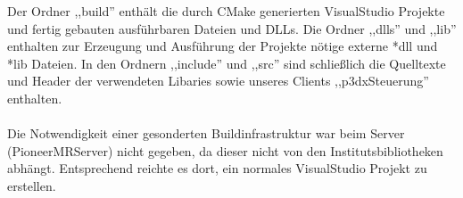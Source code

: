 Der Ordner ,,build'' enthält die durch CMake generierten VisualStudio
Projekte und fertig gebauten ausführbaren Dateien und DLLs. Die Ordner
,,dlls'' und ,,lib'' enthalten zur Erzeugung und Ausführung der
Projekte nötige externe *dll und *lib Dateien. In den Ordnern
,,include'' und ,,src'' sind schließlich die Quelltexte und Header der
verwendeten Libaries sowie unseres Clients ,,p3dxSteuerung''
enthalten. \\\\
Die Notwendigkeit einer gesonderten Buildinfrastruktur war beim
Server (PioneerMRServer) nicht 
gegeben, da dieser nicht von den Institutsbibliotheken
abhängt. Entsprechend reichte es dort, ein normales VisualStudio Projekt
zu erstellen. 



